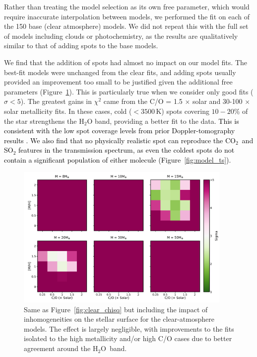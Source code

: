 \documentclass[twocolumn]{aastex63} %
\newcommand{\water}{H$_2$O}
\newcommand{\cotwo}{CO$_2$}
\newcommand{\newedit}[1]{\textcolor{black}{#1}}
\begin{document}
Rather than treating the model selection as its own free parameter, which would require inaccurate interpolation between models, we performed the fit on each of the 150 base (clear atmosphere) models. We did not repeat this with the full set of models including clouds or photochemistry, as the results are qualitatively similar to that of adding spots to the base models. 

We find that the addition of spots had almost no impact on our model fits. The best-fit models were unchanged from the clear fits, and adding spots usually provided an improvement too small to be justified given the additional free parameters (Figure~\ref{fig:spotchisq}). This is particularly true when we consider only good fits ($\sigma<5$). The greatest gains in $\chi^2$ came from the C/O = 1.5 $\times$ solar and 30-100 $\times$ solar metallicity fits. In these cases, cold ($<3500$\,K) spots covering $10-20$\% of the star strengthens the H$_2$O band, providing a better fit to the data. \newedit{This is consistent with the low spot coverage levels from prior Doppler-tomography results \citep{heitzmann2021obliquity}. We also find that no physically realistic spot can reproduce the \cotwo\ and SO$_2$ features in the transmission spectrum, as even the coldest spots do not contain a significant population of either molecule (Figure~\ref{fig:model_ts}).} 


\begin{figure}[ht]
    \centering
    \includegraphics[width=0.93\textwidth]{fig_sigma_hip67522b_newdata_spot_60k_NoOutlier.pdf}
    \caption{Same as Figure~\ref{fig:clear_chisq} but including the impact of inhomogeneities on the stellar surface for the clear-atmosphere models. The effect is largely negligible, with improvements to the fits isolated to the high metallicity and/or high C/O cases due to better agreement around the \water\ band.}
    \label{fig:spotchisq}
\end{figure} 
\end{document}
